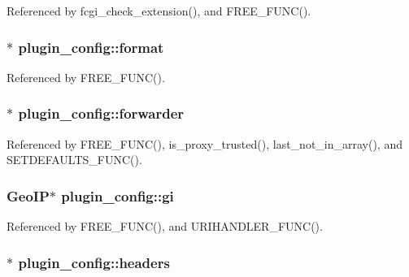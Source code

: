 Referenced by fcgi\-\_\-check\-\_\-extension(), and F\-R\-E\-E\-\_\-\-F\-U\-N\-C().

\hypertarget{structplugin__config_af1cea69ff3a5d21625609be6668fa138}{
\subsubsection[{format}]{$\ast$ plugin\-\_\-config\-::format}}\label{structplugin__config_af1cea69ff3a5d21625609be6668fa138}


Referenced by F\-R\-E\-E\-\_\-\-F\-U\-N\-C().

\hypertarget{structplugin__config_a56c04edf2b12ab4b825c28746cd54a5f}{
\subsubsection[{forwarder}]{$\ast$ plugin\-\_\-config\-::forwarder}}\label{structplugin__config_a56c04edf2b12ab4b825c28746cd54a5f}


Referenced by F\-R\-E\-E\-\_\-\-F\-U\-N\-C(), is\-\_\-proxy\-\_\-trusted(), last\-\_\-not\-\_\-in\-\_\-array(), and S\-E\-T\-D\-E\-F\-A\-U\-L\-T\-S\-\_\-\-F\-U\-N\-C().

\hypertarget{structplugin__config_ad3e9396bef72a788482aad34fa367a31}{
\subsubsection[{gi}]{\setlength{\rightskip}{0pt plus 5cm}Geo\-I\-P$\ast$ plugin\-\_\-config\-::gi}}\label{structplugin__config_ad3e9396bef72a788482aad34fa367a31}


Referenced by F\-R\-E\-E\-\_\-\-F\-U\-N\-C(), and U\-R\-I\-H\-A\-N\-D\-L\-E\-R\-\_\-\-F\-U\-N\-C().

\hypertarget{structplugin__config_a127bbf4bc25a23462d021449a6349c6d}{
\subsubsection[{headers}]{$\ast$ plugin\-\_\-config\-::headers}}\label{structplugin__config_a127bbf4bc25a23462d021449a6349c6d}


